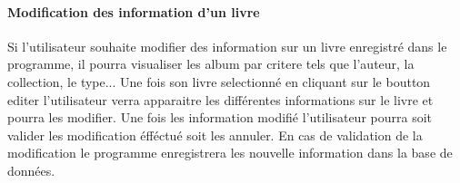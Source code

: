 \paragraph{Modification des information d'un livre}
Si l'utilisateur souhaite modifier des information sur un livre enregistré dans le programme, il pourra visualiser les album par critere tels que l'auteur, la collection, le type...
Une fois son livre selectionné en cliquant sur le boutton editer l'utilisateur verra apparaitre les différentes informations sur le livre et pourra les modifier.
Une fois les information modifié l'utilisateur pourra soit valider les modification éfféctué soit les annuler. 
En cas de validation de la modification le programme enregistrera les nouvelle information dans la base de données.  